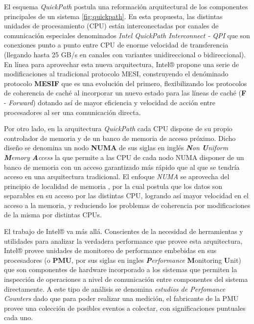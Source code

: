 El esquema \emph{QuickPath} postula una reformación arquitectural de los componentes principales de un sistema \ref{fig:quickpath}. En esta propuesta, las distintas unidades de procesamiento (CPU) están interconectadas por canales de comunicación especiales denominados \emph{Intel QuickPath Interconnect - QPI} que son conexiones punto a punto entre CPU de enorme velocidad de transferencia (llegando hasta 25 GB/s en canales con variantes unidireccional o bidireccional). En línea para aprovechar esta nueva arquitectura, Intel® propone una serie de modificaciones al tradicional protocolo MESI, construyendo el denóminado protocolo \textbf{MESIF} que es una evolución del primero, flexibilizando los protocolos de coherencia de caché al incorporar un nuevo estado para las líneas de caché (\textbf{F} - \emph{Forward}) dotando así de mayor eficiencia y velocidad de acción entre procesadores al ser una comunicación directa.

Por otro lado, en la arquitectura \emph{QuickPath} cada CPU dispone de su propio controlador de memoria y de un banco de memoria de acceso próximo. Dicho diseño se denomina un nodo \textbf{NUMA} de sus siglas en inglés \emph{\textbf{N}on \textbf{U}niform \textbf{M}emory \textbf{A}ccess} \cite{paper:NUMA} la que permite a las CPU de cada nodo NUMA disponer de un banco de memoria con un acceso garantizado más rápido que al que se tendría acceso en una arquitectura tradicional. El enfoque \emph{NUMA} se aprovecha del principio de localidad de memoria \cite{paper:memorylocality}, por la cual postula que los datos son separables en su acceso por las distintas CPU, logrando así mayor velocidad en el acceso a la memoria, y reduciendo los problemas de coherencia por modificaciones de la misma por distintas CPUs.

El trabajo de Intel® va más allá. Conscientes de la necesidad de herramientas y utilidades para analizar la verdadera performance que provee esta arquitectura, Intel® provee unidades de monitoreo de performance embebidas en sus procesadores (o \textbf{PMU}, por sus siglas en ingles \emph{\textbf{P}erformance} \textbf{M}onitoring \textbf{U}nit) que son componentes de hardware incorporado a los sistemas que permiten la inspección de operaciones a nivel de comunicación entre componentes del sistema directamente. A este tipo de análisis se denomina \emph{estudios de Perfomance Counters} dado que para poder realizar una medición, el fabricante de la PMU provee una colección de posibles eventos a colectar, con significaciones puntuales cada uno.

